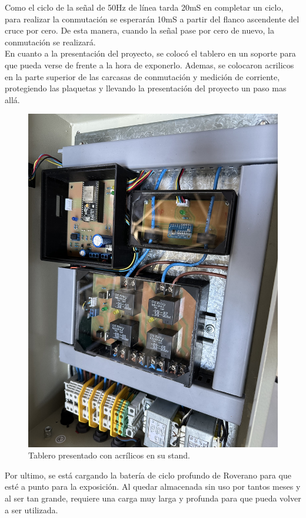 Como el ciclo de la señal de 50Hz de línea tarda 20mS en completar un ciclo, para realizar la conmutación se esperarán 10mS a partir del flanco ascendente del cruce por cero. De esta manera, cuando la señal pase por cero de nuevo, la conmutación se realizará.\\

En cuanto a la presentación del proyecto, se colocó el tablero en un soporte para que pueda verse de frente a la hora de exponerlo. Ademas, se colocaron acrilicos en la parte superior de las carcasas de conmutación y medición de corriente, protegiendo las plaquetas y llevando la presentación del proyecto un paso mas allá.\\

\begin{figure}[H]
    \centering
    \includegraphics[width=0.75\linewidth]{informes/IMG_9488.jpg}
    \caption{Tablero presentado con acrílicos en su stand.}
\end{figure}

Por ultimo, se está cargando la batería de ciclo profundo de Roverano para que esté a punto para la exposición. Al quedar almacenada sin uso por tantos meses y al ser tan grande, requiere una carga muy larga y profunda para que pueda volver a ser utilizada.\\

